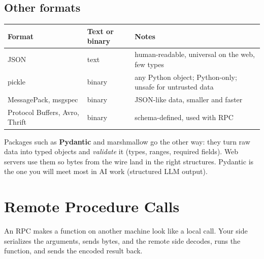 \subsection{Other formats}

\begin{center}
\begin{tabularx}{\linewidth}{@{}l l X@{}}
\toprule
\textbf{Format} & \textbf{Text or binary} & \textbf{Notes} \\
\midrule
JSON & text & human-readable, universal on the web, few types \\
pickle & binary & any Python object; Python-only; unsafe for untrusted data \\
MessagePack, msgspec & binary & JSON-like data, smaller and faster \\
Protocol Buffers, Avro, Thrift & binary & schema-defined, used with RPC \\
\bottomrule
\end{tabularx}
\end{center}

Packages such as \textbf{Pydantic} and marshmallow go the other way: they turn raw data
into typed objects and \emph{validate} it (types, ranges, required fields). Web servers
use them so bytes from the wire land in the right structures. Pydantic is the one you
will meet most in AI work (structured LLM output).

\section{Remote Procedure Calls}

An RPC makes a function on another machine look like a local call. Your side serializes
the arguments, sends bytes, and the remote side decodes, runs the function, and sends the
encoded result back.

\begin{center}
\end{center}

